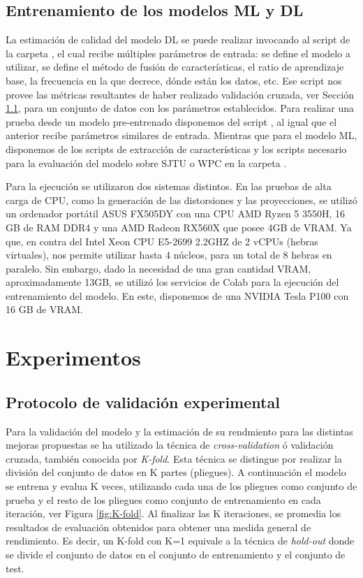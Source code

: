 \subsection{Entrenamiento de los modelos ML y DL} 
\label{sec:TrainML}
La estimación de calidad del modelo DL se puede realizar invocando al script  de la carpeta ,
el cual recibe múltiples parámetros de entrada: se define el modelo a utilizar, 
se define el método de fusión de características, el ratio de aprendizaje base,
la frecuencia en la que decrece, dónde están los datos, etc. Ese script nos 
provee las métricas resultantes de haber realizado validación cruzada, 
ver Sección \ref{sec:Validation}, 
para un conjunto de datos con los parámetros establecidos. 
Para realizar una prueba desde un modelo pre-entrenado disponemos del script 
, al igual que el anterior recibe parámetros similares de entrada.
Mientras que para el modelo ML, disponemos de los scripts de extracción 
de características y los scripts necesario para la evaluación del 
modelo sobre SJTU\cite{SJTU} o WPC\cite{WPC1, WPC2} en la carpeta .

Para la ejecución se utilizaron dos sistemas distintos. En las pruebas de alta 
carga de CPU, como la generación de las distorsiones y las proyecciones, 
se utilizó un ordenador portátil ASUS FX505DY con una CPU AMD Ryzen 5 
3550H, 16 GB de RAM DDR4 y una AMD Radeon RX560X que posee 4GB de VRAM. Ya 
que, en contra del Intel Xeon CPU E5-2699 2.2GHZ de 2 vCPUs (hebras virtuales), 
nos permite utilizar hasta 4 núcleos, para un total de 8 hebras en paralelo. 
Sin embargo, dado la necesidad de una gran cantidad VRAM, aproximadamente 13GB, 
se utilizó los servicios de Colab para la ejecución del entrenamiento del modelo. 
En este, disponemos de una NVIDIA Tesla P100 con 16 GB de VRAM.  

\section{Experimentos} 
\subsection{Protocolo de validación experimental} 
\label{sec:Validation}
Para la validación del modelo y la estimación de su rendmiento para las distintas 
mejoras propuestas se ha utilizado la técnica de \emph{cross-validation} ó 
validación cruzada, también conocida por \emph{K-fold}. 
Esta técnica se distingue por realizar la división del conjunto de datos 
en K partes (pliegues). A continuación el modelo se entrena y evalua K veces, utilizando 
cada una de los pliegues como conjunto de prueba y el resto de los pliegues como 
conjunto de entrenamiento en cada iteración, ver Figura \ref{fig:K-fold}. 
Al finalizar las K iteraciones, se promedia los resultados de evaluación 
obtenidos para obtener una medida general de rendimiento. 
Es decir, un K-fold con K=1 equivale a la técnica de \emph{hold-out} 
donde se divide el conjunto de datos en el conjunto de entrenamiento y 
el conjunto de test.  

